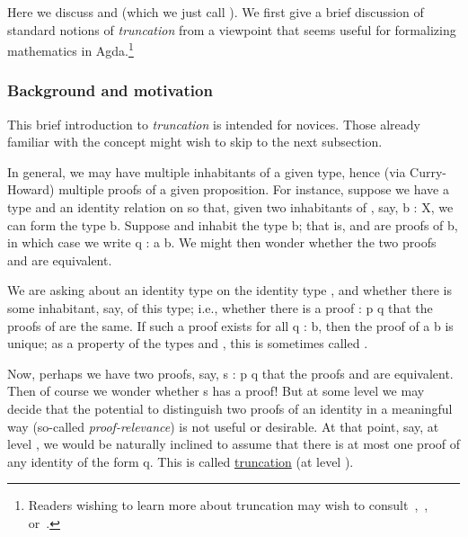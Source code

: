 Here we discuss  and  (which we just call ). We first give a brief discussion of standard notions of \emph{truncation} from a viewpoint that seems useful for formalizing mathematics in Agda.\footnote{Readers wishing to learn more about truncation may wish to consult~\cite[\S34]{MHE},~\cite{Brunerie:2012}, or~\cite[\S7.1]{HoTT}.}

\subsubsection{Background and motivation}\label{truncation}
This brief introduction to \emph{truncation} is intended for novices. Those already familiar with the concept might wish to skip to the next subsection.

In general, we may have multiple inhabitants of a given type, hence (via Curry-Howard) multiple proofs of a given proposition. For instance, suppose we have a type  and an identity relation  on  so that, given two inhabitants of , say,  \ab b \as : \ab X, we can form the type   \ab b. Suppose  and  inhabit the type   \ab b; that is,  and  are proofs of   \ab b, in which case we write  \ab q \as : \ab a  \ab b. We might then wonder whether the two proofs  and  are equivalent.

We are asking about an identity type on the identity type , and whether there is some inhabitant, say,  of this type; i.e., whether there is a proof  \as : \ab p  \ab q that the proofs of    are the same. If such a proof exists for all  \ab q \as :   \ab b, then the proof of \ab a  \ab b is unique; as a property of the types  and , this is sometimes called .

Now, perhaps we have two proofs, say,  \ab s \as : \ab p  \ab q that the proofs  and  are equivalent. Then of course we wonder whether   \ab s has a proof!  But at some level we may decide that the potential to distinguish two proofs of an identity in a meaningful way (so-called \emph{proof-relevance}) is not useful or desirable. At that point, say, at level , we would be naturally inclined to assume that there is at most one proof of any identity of the form   \ab q. This is called \href{https://www.cs.bham.ac.uk/~mhe/HoTT-UF-in-Agda-Lecture-Notes/HoTT-UF-Agda.html\#truncation}{truncation} (at level ).

